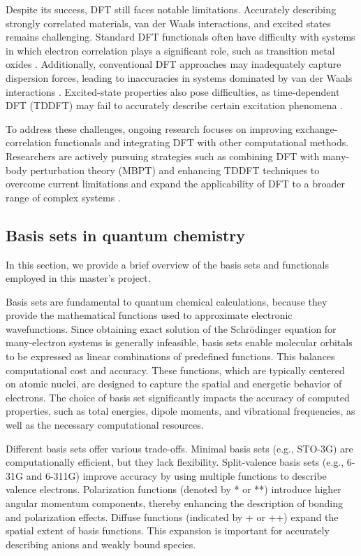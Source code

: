 Despite its success, DFT still faces notable limitations. Accurately describing strongly correlated materials, van der Waals interactions, and excited states remains challenging. Standard DFT functionals often have difficulty with systems in which electron correlation plays a significant role, such as transition metal oxides \cite{DFT_strongly_correlated}. Additionally, conventional DFT approaches may inadequately capture dispersion forces, leading to inaccuracies in systems dominated by van der Waals interactions \cite{DFT_vdw_limitations}. Excited-state properties also pose difficulties, as time-dependent DFT (TDDFT) may fail to accurately describe certain excitation phenomena \cite{TDDFT_challenges}.

To address these challenges, ongoing research focuses on improving exchange-correlation functionals and integrating DFT with other computational methods. Researchers are actively pursuing strategies such as combining DFT with many-body perturbation theory (MBPT) and enhancing TDDFT techniques to overcome current limitations and expand the applicability of DFT to a broader range of complex systems \cite{DFT_MBPT_TDDFT}.


\subsection{Basis sets in quantum chemistry}

In this section, we provide a brief overview of the basis sets and functionals employed in this master's project.


Basis sets are fundamental to quantum chemical calculations, because they provide the mathematical functions used to approximate electronic wavefunctions. Since obtaining  exact solution of the Schrödinger equation for many-electron systems is generally infeasible, basis sets enable molecular orbitals to be expressed as linear combinations of predefined functions. This balances computational cost and accuracy. These functions, which are typically centered on atomic nuclei, are designed to capture the spatial and energetic behavior of electrons. The choice of basis set significantly impacts the accuracy of computed properties, such as total energies, dipole moments, and vibrational frequencies, as well as the necessary computational resources.

Different basis sets offer various trade-offs. Minimal basis sets (e.g., STO-3G) are computationally efficient, but they lack flexibility. Split-valence basis sets (e.g., 6-31G and 6-311G) improve accuracy by using multiple functions to describe valence electrons. Polarization functions (denoted by * or **) introduce higher angular momentum components, thereby enhancing the description of bonding and polarization effects. Diffuse functions (indicated by + or ++) expand the spatial extent of basis functions. This expansion is important for accurately describing anions and weakly bound species.

